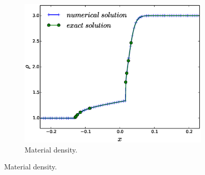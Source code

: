 \documentclass[times,doublespace]{fldauth}%
\begin{document}
\begin{figure}[h]
    ~
    \begin{subfigure}{0.32\textwidth}
    \centering
    \includegraphics[width=\linewidth]{figures/dpt-xs/mass-diff-density-nel-2700-plot.eps}
    \caption{Material density.}\label{fig:mach-3-dpt-xs-dens}
    \end{subfigure}


\end{figure}
\end{document}
